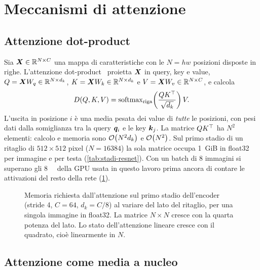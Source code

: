 \section{Meccanismi di attenzione}
\label{sec:attenzione}

\subsection{Attenzione dot-product}
\label{sec:attenzione-dot}

Sia $\bm{X}\in\mathbb{R}^{N\times C}$ una mappa di caratteristiche con le $N=hw$ posizioni disposte in
righe. L'attenzione dot-product~\cite{vaswani2017attention} proietta $\bm{X}$ in query, key e
value, $Q=\bm{X}W_q\in\mathbb{R}^{N\times d_k}$, $K=\bm{X}W_k\in\mathbb{R}^{N\times d_k}$ e
$V=\bm{X}W_v\in\mathbb{R}^{N\times C}$, e calcola
\begin{equation}
  D(Q,K,V)=\operatorname{softmax}_{\mathrm{riga}}\!\left(\frac{QK^{\top}}{\sqrt{d_k}}\right)V .
  \label{eq:dot-product}
\end{equation}
L'uscita in posizione $i$ è una media pesata dei value di \emph{tutte} le posizioni, con pesi
dati dalla somiglianza tra la query $\bm{q}_i$ e le key $\bm{k}_j$. La matrice $QK^{\top}$ ha
$N^2$ elementi: calcolo e memoria sono $\mathcal{O}\!\left(N^2 d_k\right)$ e $\mathcal{O}\!\left(N^2\right)$. Sul primo stadio di un
ritaglio di $512\times512$ pixel ($N=\num{16384}$) la sola matrice occupa \SI{1}{GiB} in
float32 per immagine e per testa (\cref{tab:stadi-resnet}). Con un batch di 8 immagini si
superano gli \SI{8}{\giga\byte} della GPU usata in questo lavoro prima ancora di contare le
attivazioni del resto della rete (\cref{fig:complessita}).

\begin{figure}[t]
  \centering
  
  \caption[Memoria dell'attenzione dot-product e lineare]{Memoria richiesta dall'attenzione sul
    primo stadio dell'encoder (stride 4, $C=64$, $d_k=C/8$) al variare del lato del ritaglio,
    per una singola immagine in float32. La matrice $N\times N$ cresce con la quarta potenza
    del lato. Lo stato dell'attenzione lineare cresce con il quadrato, cioè linearmente in
    $N$.}
  \label{fig:complessita}
\end{figure}

\subsection{Attenzione come media a nucleo}
\label{sec:attenzione-nucleo}

